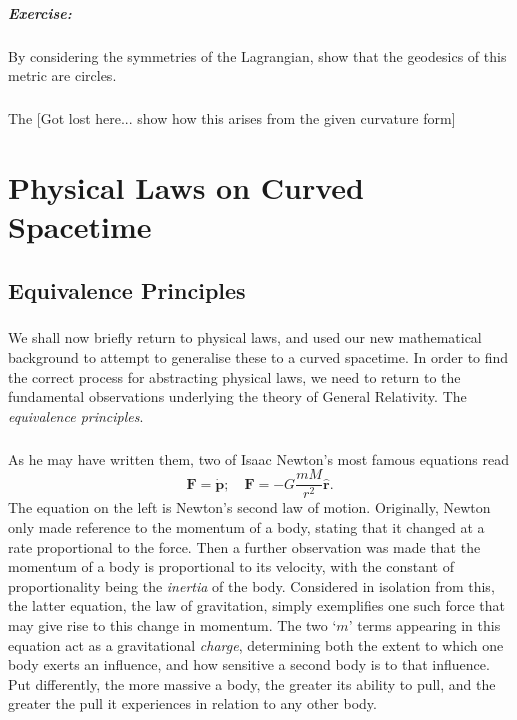 \documentclass[11pt,fleqn]{report}
\begin{document}
\paragraph{Exercise:} By considering the symmetries of the Lagrangian, show that the geodesics of this metric are circles.

\paragraph{} The [Got lost here... show how this arises from the given curvature form]

\chapter{Physical Laws on Curved Spacetime}

\section{Equivalence Principles}

\paragraph{} We shall now briefly return to physical laws, and used our new mathematical background to attempt to generalise these to a curved spacetime. In order to find the correct process for abstracting physical laws, we need to return to the fundamental observations underlying the theory of General Relativity. The \textit{equivalence principles}.

\paragraph{} As he may have written them, two of Isaac Newton's most famous equations read
	\begin{equation}\label{eq:NewtonsLaws}
		\mathbf{F} = \dot{\mathbf{p}}; \quad \mathbf{F} = - G \frac{m M}{r^2}\hat{\mathbf{r}}. 
	\end{equation}
The equation on the left is Newton's second law of motion. Originally, Newton only made reference to the momentum of a body, stating that it changed at a rate proportional to the force. Then a further observation was made that the momentum of a body is proportional to its velocity, with the constant of proportionality being the \textit{inertia} of the body. Considered in isolation from this, the latter equation, the law of gravitation, simply exemplifies one such force that may give rise to this change in momentum. The two `$m$' terms appearing in this equation act as a gravitational \textit{charge}, determining both the extent to which one body exerts an influence, and how sensitive a second body is to that influence. Put differently, the more massive a body, the greater its ability to pull, and the greater the pull it experiences in relation to any other body.
\end{document}
